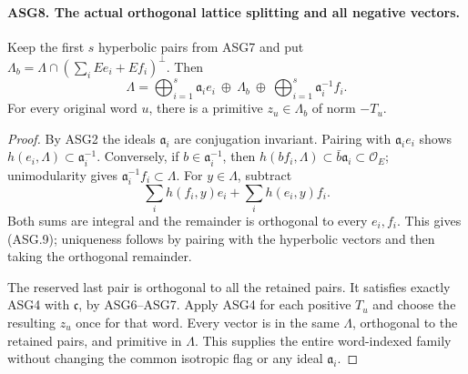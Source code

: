 \documentclass[11pt,a4paper]{article}
\numberwithin{equation}{section}
\theoremstyle{remark}\newtheorem{remark}[theorem]{Remark}
\begin{document}
\paragraph{ASG8. The actual orthogonal lattice splitting and all negative vectors.}
\label{claim:ASG8}
Keep the first \(s\) hyperbolic pairs from ASG7 and put
\(\Lambda_b=\Lambda\cap(\sum_i Ee_i+Ef_i)^\perp\).
Then
\[
 \Lambda=\bigoplus_{i=1}^{s}\mathfrak a_i e_i
              \ \oplus\ \Lambda_b
              \ \oplus\ \bigoplus_{i=1}^{s}\mathfrak a_i^{-1}f_i.
\tag{ASG.9}
\]
For every original word \(u\), there is a primitive
\(z_u\in\Lambda_b\) of norm \(-T_u\).
\begin{proof}
By ASG2 the ideals \(\mathfrak a_i\) are conjugation invariant.
Pairing with \(\mathfrak a_i e_i\) shows
\(h(e_i,\Lambda)\subset\mathfrak a_i^{-1}\).
Conversely, if \(b\in\mathfrak a_i^{-1}\), then
\(h(bf_i,\Lambda)\subset\bar b\mathfrak a_i\subset\mathcal O_E\);
unimodularity gives \(\mathfrak a_i^{-1}f_i\subset\Lambda\).
For \(y\in\Lambda\), subtract
\[
            \sum_i h(f_i,y)e_i+\sum_i h(e_i,y)f_i.
\]
Both sums are integral and the remainder is orthogonal to every
\(e_i,f_i\).  This gives (ASG.9); uniqueness follows by pairing
with the hyperbolic vectors and then taking the orthogonal remainder.

The reserved last pair is orthogonal to all the retained pairs.
It satisfies exactly ASG4 with \(\mathfrak c\), by ASG6--ASG7.
Apply ASG4 for each positive \(T_u\) and choose the resulting
\(z_u\) once for that word.  Every vector is in the same
\(\Lambda\), orthogonal to the retained pairs, and primitive in
\(\Lambda\).  This supplies the entire word-indexed family without
changing the common isotropic flag or any ideal \(\mathfrak a_i\).
\end{proof}

\end{document}
